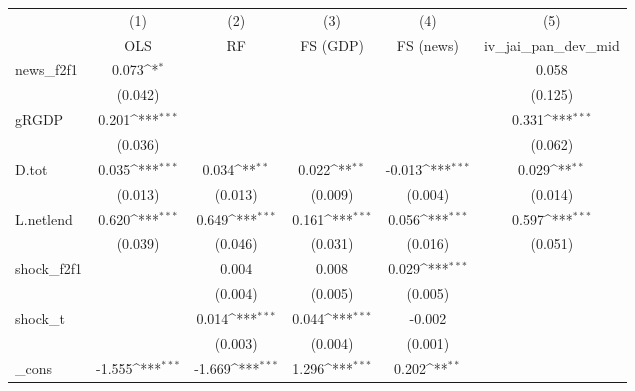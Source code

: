 {
\def\sym#1{\ifmmode^{#1}\else\(^{#1}\)\fi}
\begin{tabular}{l*{5}{c}}
\toprule
            &\multicolumn{1}{c}{(1)}&\multicolumn{1}{c}{(2)}&\multicolumn{1}{c}{(3)}&\multicolumn{1}{c}{(4)}&\multicolumn{1}{c}{(5)}\\
            &\multicolumn{1}{c}{OLS}&\multicolumn{1}{c}{RF}&\multicolumn{1}{c}{FS (GDP)}&\multicolumn{1}{c}{FS (news)}&\multicolumn{1}{c}{iv\_jai\_pan\_dev\_mid}\\
\midrule
news\_f2f1   &       0.073\sym{*}  &                     &                     &                     &       0.058         \\
            &     (0.042)         &                     &                     &                     &     (0.125)         \\
\addlinespace
gRGDP       &       0.201\sym{***}&                     &                     &                     &       0.331\sym{***}\\
            &     (0.036)         &                     &                     &                     &     (0.062)         \\
\addlinespace
D.tot       &       0.035\sym{***}&       0.034\sym{**} &       0.022\sym{**} &      -0.013\sym{***}&       0.029\sym{**} \\
            &     (0.013)         &     (0.013)         &     (0.009)         &     (0.004)         &     (0.014)         \\
\addlinespace
L.netlend   &       0.620\sym{***}&       0.649\sym{***}&       0.161\sym{***}&       0.056\sym{***}&       0.597\sym{***}\\
            &     (0.039)         &     (0.046)         &     (0.031)         &     (0.016)         &     (0.051)         \\
\addlinespace
shock\_f2f1  &                     &       0.004         &       0.008         &       0.029\sym{***}&                     \\
            &                     &     (0.004)         &     (0.005)         &     (0.005)         &                     \\
\addlinespace
shock\_t     &                     &       0.014\sym{***}&       0.044\sym{***}&      -0.002         &                     \\
            &                     &     (0.003)         &     (0.004)         &     (0.001)         &                     \\
\addlinespace
\_cons      &      -1.555\sym{***}&      -1.669\sym{***}&       1.296\sym{***}&       0.202\sym{**} &                     \\

\end{tabular}}
